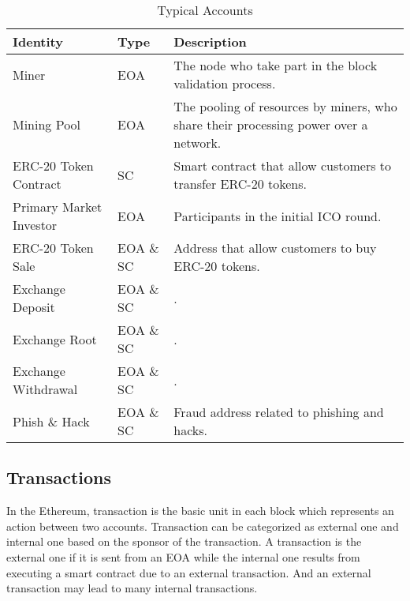 \begin{table}[htbp]
\caption{Typical Accounts}
\begin{center}
\begin{tabular}{|p{1.7cm}|l|p{3.7cm}|}
\hline
\textbf{Identity} & \textbf{Type}& \textbf{Description} \\
\hline
Miner & EOA & The node who take part in the block validation process. \\ \hline
Mining Pool & EOA & The pooling of resources by miners, who share their processing power over a network.\\ \hline
ERC-20 Token Contract & SC & Smart contract that allow customers to transfer ERC-20 tokens. \\ \hline
Primary Market Investor & EOA & Participants in the initial ICO round. \\ \hline
ERC-20 Token Sale & EOA \& SC & Address that allow customers to buy ERC-20 tokens. \\ \hline
Exchange Deposit & EOA \& SC & . \\ \hline
Exchange Root & EOA \& SC & . \\ \hline
Exchange Withdrawal & EOA \& SC & . \\ \hline
Phish \& Hack & EOA \& SC & Fraud address related to phishing and hacks. \\ \hline
\end{tabular}
\label{tab1}
\end{center}
\end{table}






\subsection{Transactions}
In the Ethereum, transaction is the basic unit in each block which represents an action between two accounts. Transaction can be categorized as external one and internal one based on the sponsor of the transaction. A transaction is the external one if it is sent from an EOA while the internal one results from executing a smart contract due to an external transaction. And an external transaction may lead to many internal transactions\cite{chen2018infocom}.

